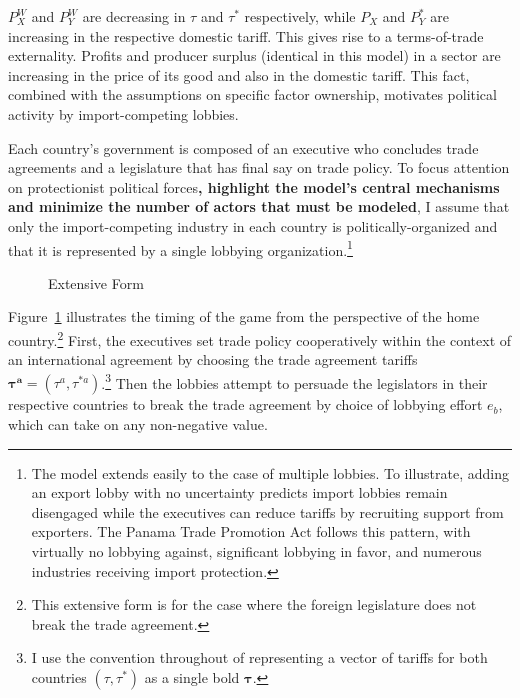 \documentclass[10pt]{article}
\newcommand{\bta}{\bm{\tau^a}}
\begin{document}
$P_X^W$ and $P_Y^W$ are decreasing in $\tau$ and $\tau^*$ respectively, while $P_X$ and $P_Y^*$ are increasing in the respective domestic tariff. This gives rise to a terms-of-trade externality. Profits and producer surplus (identical in this model) in a sector are increasing in the price of its good and also in the domestic tariff. This fact, combined with the assumptions on specific factor ownership, motivates political activity by import-competing lobbies.

Each country's government is composed of an executive who concludes trade agreements and a legislature that has final say on trade policy. To focus attention on protectionist political forces\textbf{, highlight the model's central mechanisms and minimize the number of actors that must be modeled}, I assume that only the import-competing industry in each country is politically-organized and that it is represented by a single lobbying organization.\footnote{The model extends easily to the case of multiple lobbies. To illustrate, adding an export lobby with no uncertainty predicts import lobbies remain disengaged while the executives can reduce tariffs by recruiting support from exporters. The Panama Trade Promotion Act follows this pattern, with virtually no lobbying against, significant lobbying in favor, and numerous industries receiving import protection.\label{fn:lobby}} 

\begin{figure}
	\begin{center}
		
	\end{center}
	\caption{Extensive Form\label{fig:ext}}
\end{figure}

Figure~\ref{fig:ext} illustrates the timing of the game from the perspective of the home country.\footnote{This extensive form is for the case where the foreign legislature does not break the trade agreement.} First, the executives set trade policy cooperatively within the context of an international agreement by choosing the trade agreement tariffs $\bta = \left(\tau^a,\tau^{*a}\right)$.\footnote{I use the convention throughout of representing a vector of tariffs for both countries $(\tau,\tau^*)$ as a single bold $\bm{\tau}$.} Then the lobbies attempt to persuade the legislators in their respective countries to break the trade agreement by choice of lobbying effort $e_b$, which can take on any non-negative value.
\end{document}
